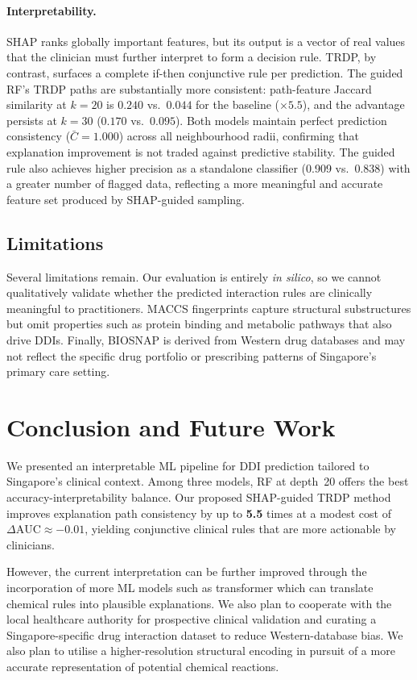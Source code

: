 \documentclass[letterpaper]{article} %
\begin{document}
\paragraph{Interpretability.}
SHAP ranks globally important features, but its output is a vector of real values that the clinician must further interpret to form a decision rule. TRDP, by contrast, surfaces a complete if-then conjunctive rule per prediction. The guided RF's TRDP paths are substantially more consistent: path-feature Jaccard similarity at $k=20$ is $0.240$ vs.\ $0.044$ for the baseline (${\times}5.5$), and the advantage persists at $k=30$ ($0.170$ vs.\ $0.095$). Both models maintain perfect prediction consistency ($\bar{C}=1.000$) across all neighbourhood radii, confirming that explanation improvement is not traded against predictive stability. The guided rule also achieves higher precision as a standalone classifier (0.909 vs.\ 0.838) with a greater number of flagged data, reflecting a more meaningful and accurate feature set produced by SHAP-guided sampling.

\subsection{Limitations}
Several limitations remain. Our evaluation is entirely \textit{in silico}, so we cannot qualitatively validate whether the predicted interaction rules are clinically meaningful to practitioners. MACCS fingerprints capture structural substructures but omit properties such as protein binding and metabolic pathways that also drive DDIs. Finally, BIOSNAP is derived from Western drug databases and may not reflect the specific drug portfolio or prescribing patterns of Singapore's primary care setting.

\section{Conclusion and Future Work}
We presented an interpretable ML pipeline for DDI prediction tailored to Singapore's clinical context. Among three models, RF at depth~20 offers the best accuracy-interpretability balance. Our proposed SHAP-guided TRDP method improves explanation path consistency by up to \textbf{5.5} times at a modest cost of $\Delta\text{AUC}\approx{-0.01}$, yielding conjunctive clinical rules that are more actionable by clinicians. 

However, the current interpretation can be further improved through the incorporation of more ML models such as transformer which can translate chemical rules into plausible explanations. We also plan to cooperate with the local healthcare authority for prospective clinical validation and curating a Singapore-specific drug interaction dataset to reduce Western-database bias. We also plan to utilise a higher-resolution structural encoding in pursuit of a more accurate representation of potential chemical reactions.
\end{document}
